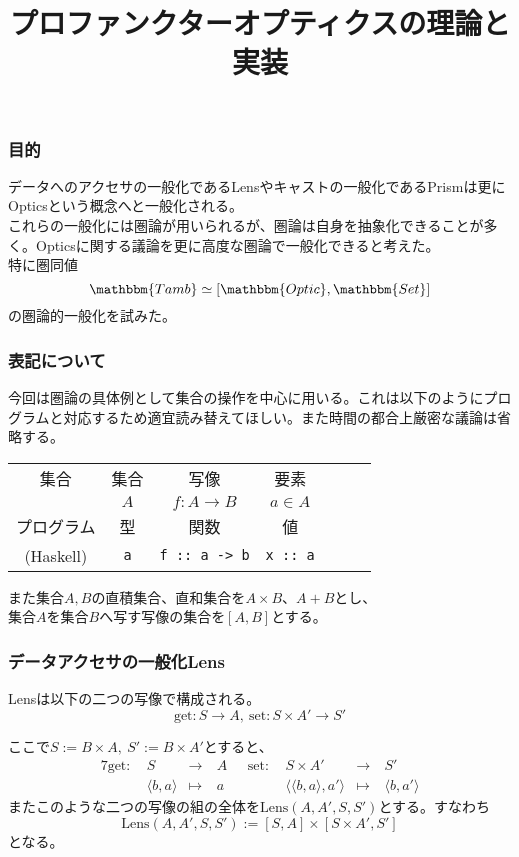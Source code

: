 \documentclass[uplatex,dvipdfmx]{beamer}
\title{プロファンクターオプティクスの理論と実装}
\author{}
\newcommand{\pr}[1]{\colorbox[rgb]{0.9,0.9,0.9}{\lstinline{#1}}}
\newcommand{\cat}[1]{\mathbbm{#1}}
\newcommand{\arrow}{\rightarrow}
\newcommand{\tuple}[1]{\langle #1\rangle}
\newcommand{\mor}[3]{#1:#2\arrow #3}
\newcommand{\inset}[2]{[#1,#2]}
\newcommand{\incat}[2]{[\cat{#1},\cat{#2}]}
\begin{document}
  \begin{frame}
    \titlepage
  \end{frame}
  \begin{frame}\frametitle{目的}
    データへのアクセサの一般化であるLensやキャストの一般化であるPrismは更にOpticsという概念へと一般化される。\\
    これらの一般化には圏論が用いられるが、圏論は自身を抽象化できることが多く。Opticsに関する議論を更に高度な圏論で一般化できると考えた。\\
    \vspace{\baselineskip}
    特に圏同値\[\cat{Tamb}\simeq\incat{Optic}{Set}\]の圏論的一般化を試みた。
  \end{frame}
  \begin{frame}\frametitle{表記について}
    今回は圏論の具体例として集合の操作を中心に用いる。これは以下のようにプログラムと対応するため適宜読み替えてほしい。また時間の都合上厳密な議論は省略する。
    \begin{table}[h]
      \centering
      \begin{tabular}{|c|c|c|c|c|c|c|}
        \hline
        集合&集合&写像&要素\\
              &$A$ &$\mor{f}{A}{B}$&$a\in A$\\
        \hline
    プログラム&型  &関数&値\\
              (Haskell)&\pr{a}&\pr{f :: a -> b}&\pr{x :: a}\\
        \hline
      \end{tabular}
    \end{table}
    また集合$A,B$の直積集合、直和集合を$A\times B$、$A+B$とし、\\
    集合$A$を集合$B$へ写す写像の集合を$\inset{A}{B}$とする。
  \end{frame}
  \begin{frame}\frametitle{データアクセサの一般化Lens}
    \begin{definition}[Lens]
      Lensは以下の二つの写像で構成される。
      \[\mor{\mathrm{get}}{S}{A},\ \mor{\mathrm{set}}{S\times A'}{S'}\]
    \end{definition}
    ここで$S:=B\times A,\ S':=B\times A'$とすると、
    \begin{alignat*}{7}
      \mathrm{get}:\ &S\ &\longrightarrow \ &A \ \ \ &\mathrm{set}:\ &S\times A'\ &\longrightarrow \ &S'\\
      &\tuple{b,a}&\longmapsto\ &a      &&\tuple{\tuple{b,a},a'}&\longmapsto\ &\tuple{b, a'}
    \end{alignat*}
    またこのような二つの写像の組の全体を$\mathrm{Lens}(A,A',S,S')$とする。すなわち\[\mathrm{Lens}(A,A',S,S') := \inset{S}{A}\times \inset{S\times A'}{S'}\]となる。
  \end{frame}
\end{document}
